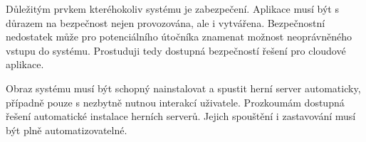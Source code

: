 \documentclass[thesis=B,czech]{FITthesis}[2019/12/23]
\begin{document}
Důležitým prvkem kteréhokoliv systému je zabezpečení. Aplikace musí být s důrazem na bezpečnost nejen provozována,
ale i vytvářena\cite{newcombe_2012}. Bezpečnostní nedostatek může pro potenciálního útočníka znamenat možnost neoprávněného vstupu do systému.
Prostuduji tedy dostupná bezpečností řešení pro cloudové aplikace.

Obraz systému musí být schopný nainstalovat a spustit herní server automaticky, případně pouze s nezbytně nutnou interakcí uživatele.
Prozkoumám dostupná řešení automatické instalace herních serverů. Jejich spouštění i zastavování musí být plně automatizovatelné.








\end{document}

